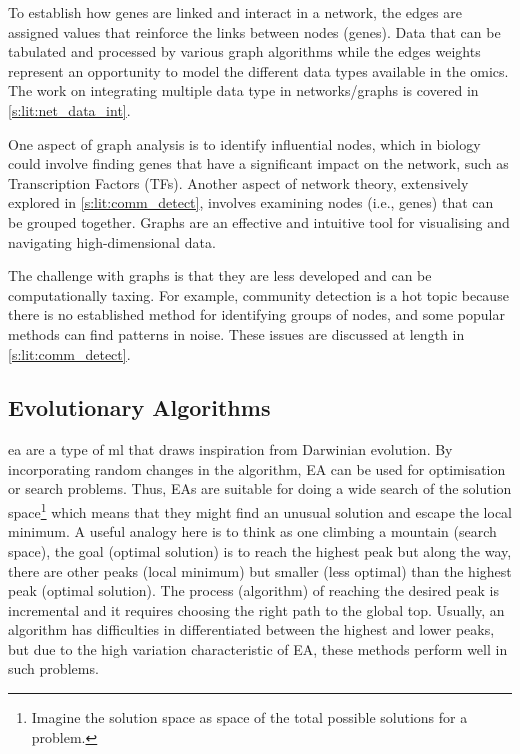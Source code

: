 To establish how genes are linked and interact in a network, the edges are assigned values that reinforce the links between nodes (genes). Data that can be tabulated and processed by various graph algorithms while the edges weights represent an opportunity to model the different data types available in the omics. The work on integrating multiple data type in networks/graphs is covered in \cref{s:lit:net_data_int}.

One aspect of graph analysis is to identify influential nodes, which in biology could involve finding genes that have a significant impact on the network, such as Transcription Factors (TFs). Another aspect of network theory, extensively explored in \cref{s:lit:comm_detect}, involves examining nodes (i.e., genes) that can be grouped together. Graphs are an effective and intuitive tool for visualising and navigating high-dimensional data.

The challenge with graphs is that they are less developed and can be computationally taxing. For example, community detection is a hot topic because there is no established method for identifying groups of nodes, and some popular methods can find patterns in noise. These issues are discussed at length in \cref{s:lit:comm_detect}.


\subsection{Evolutionary Algorithms} \label{s:lit:ea_overview}


\acrlong{ea} are a type of \acrshort{ml} that draws inspiration from Darwinian evolution. By incorporating random changes in the algorithm, EA can be used for optimisation or search problems. Thus, EAs are suitable for doing a wide search of the solution space\footnote{Imagine the solution space as space of the total possible solutions for a problem.} which means that they might find an unusual solution and escape the local minimum. A useful analogy here is to think as one climbing a mountain (search space), the goal (optimal solution) is to reach the highest peak but along the way, there are other peaks (local minimum) but smaller (less optimal) than the highest peak (optimal solution). The process (algorithm) of reaching the desired peak is incremental and it requires choosing the right path to the global top. Usually, an algorithm has difficulties in differentiated between the highest and lower peaks, but due to the high variation characteristic of EA, these methods perform well in such problems.


